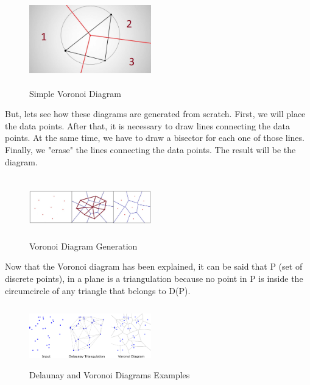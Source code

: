 \documentclass[conference]{IEEEtran}
\begin{document}
\begin{figure}[H]
    \centering
    \includegraphics[width=200,height=150,keepaspectratio]{maxresdefault2.jpg}
    \caption{Simple Voronoi Diagram}
    \label{fig:VoronoiDiagram1}
\end{figure}

But, lets see how these diagrams are generated from scratch. First, we will place the data points. After that, it is necessary to draw lines connecting the data points. At the same time, we have to draw a bisector for each one of those lines. Finally, we "erase" the lines connecting the data points. The result will be the diagram.

\begin{figure}[H]
    \centering
    \includegraphics[width=200px,height=100px,keepaspectratio]{DiagramGeneration.jpg}
    \caption{Voronoi Diagram Generation}
    \label{fig:VoronoiDiagram1}
\end{figure}

Now that the Voronoi diagram has been explained, it can be said that P (set of discrete points), in a plane is a triangulation because no point in P is inside the circumcircle of any triangle that belongs to D(P).

\begin{figure}[H]
    \centering
    \includegraphics[width=200px,height=100px,keepaspectratio]{Delaunay&VoronoiDiagrams.png}
    \caption{Delaunay and Voronoi Diagrams Examples}
    \label{fig:Delaunay&Voronoi}
\end{figure}
\end{document}
